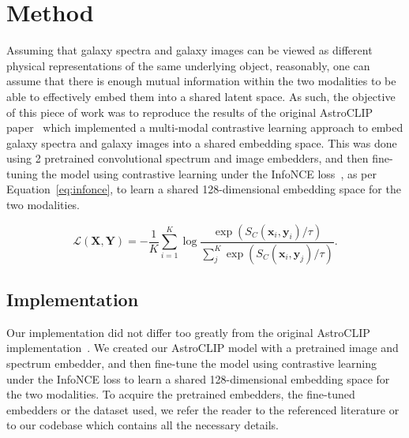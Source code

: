 
\section{Method}\label{sec:method}
Assuming that galaxy spectra and galaxy images can be viewed as different physical representations of the same underlying
object, reasonably, one can assume that there is enough mutual information within the two modalities to be able to effectively
embed them into a shared latent space.
As such, the objective of this piece of work was to reproduce the results of the original AstroCLIP paper~\citep{astroclip}
which implemented a multi-modal contrastive learning approach to embed galaxy spectra and galaxy images into a shared embedding
space.
This was done using 2 pretrained convolutional spectrum and image embedders, and then fine-tuning the model using contrastive
learning under the InfoNCE loss~\citep{oord2019}, as per Equation~\eqref{eq:infonce}, to learn a shared 128-dimensional embedding space for the two modalities.

\begin{equation}
\label{eq:infonce}
    \mathcal{L}(\mathbf{X}, \mathbf{Y}) = - \frac{1}{K} \sum_{i=1}^K \log \frac{\exp(S_C(\mathbf{x}_i, \mathbf{y}_i) / \tau)}{\sum_{j}^K \exp(S_C(\mathbf{x}_i, \mathbf{y}_j) / \tau)}.
\end{equation}

\subsection{Implementation}\label{subsec:implementation}
Our implementation did not differ too greatly from the original AstroCLIP implementation~\citep{astroclip}.
We created our AstroCLIP model with a pretrained image and spectrum embedder, and then fine-tune the model using contrastive
learning under the InfoNCE loss to learn a shared 128-dimensional embedding space for the two modalities.
To acquire the pretrained embedders, the fine-tuned embedders or the dataset used, we refer the reader to the referenced
literature or to our codebase which contains all the necessary details.

